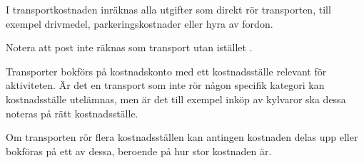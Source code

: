 		I transportkostnaden inräknas alla utgifter som direkt rör transporten, till exempel drivmedel, parkeringskostnader eller hyra av fordon.
		
		Notera att post inte räknas som transport utan istället .
		
					\begin{redovisning}
						Transporter bokförs på kostnadskonto  med ett kostnadsställe relevant för aktiviteten. Är det en transport som inte rör någon specifik kategori kan kostnadsställe utelämnas, men är det till exempel inköp av kylvaror ska dessa noteras på rätt kostnadsställe.
		
		Om transporten rör flera kostnadsställen kan antingen kostnaden delas upp eller bokföras på ett av dessa, beroende på hur stor kostnaden är.
					\end{redovisning}
				